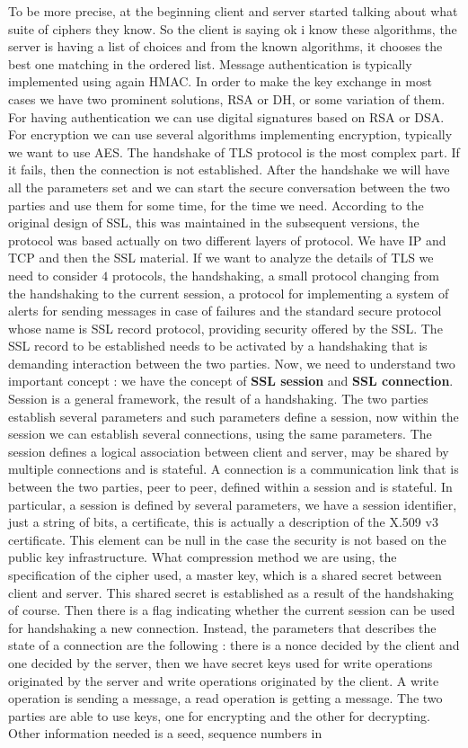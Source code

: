 \documentclass[11pt]{article}
\begin{document}
To be more precise, at the beginning client and server started talking about what suite of ciphers they know. So the client is saying ok i know these algorithms, the server is having a list of choices and from the known algorithms, it chooses the best one matching in the ordered list. Message authentication is typically implemented using again HMAC. In order to make the key exchange in most cases we have two prominent solutions, RSA or DH, or some variation of them. For having authentication we can use digital signatures based on RSA or DSA. For encryption we can use several algorithms implementing encryption, typically we want to use AES. The handshake of TLS protocol is the most complex part. If it fails, then the connection is not established. After the handshake we will have all the parameters set and we can start the secure conversation between the two parties and use them for some time, for the time we need. According to the original design of SSL, this was maintained in the subsequent versions, the protocol was based actually on two different layers of protocol. We have IP and TCP and then the SSL material. If we want to analyze the details of TLS we need to consider $4$ protocols, the handshaking, a small protocol changing from the handshaking to the current session, a protocol for implementing a system of alerts for sending messages in case of failures and the standard secure protocol whose name is SSL record protocol, providing security offered by the SSL. The SSL record to be established needs to be activated by a handshaking that is demanding interaction between the two parties. Now, we need to understand two important concept : we have the concept of \textbf{SSL session} and \textbf{SSL connection}. Session is a general framework, the result of a handshaking. The two parties establish several parameters and such parameters define a session, now within the session we can establish several connections, using the same parameters. The session defines a logical association between client and server, may be shared by multiple connections and is stateful. A connection is a communication link that is between the two parties, peer to peer, defined within a session and is stateful. In particular, a session is defined by several parameters, we have a session identifier, just a string of bits, a certificate, this is actually a description of the X.509 v3 certificate. This element can be null in the case the security is not based on the public key infrastructure. What compression method we are using, the specification of the cipher used, a master key, which is a shared secret between client and server. This shared secret is established as a result of the handshaking of course. Then there is a flag indicating whether the current session can be used for handshaking a new connection.  Instead, the parameters that describes the state of a connection are the following : there is a nonce decided by the client and one decided by the server, then we have secret keys used for write operations originated by the server and write operations originated by the client. A write operation is sending a message, a read operation is getting a message. The two parties are able to use keys, one for encrypting and the other for decrypting. Other information needed is a seed, sequence numbers in 
\end{document}
